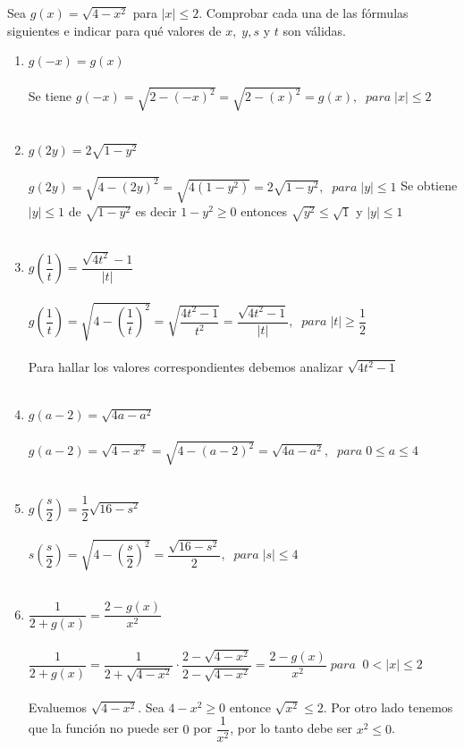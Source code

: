 \begin{ej}
Sea $g(x) = \sqrt{4-x^2}$ para $|x| \leq 2$. Comprobar cada una de las fórmulas siguientes e indicar para qué valores de $x, \; y, s$ y $t$ son válidas.
\begin{enumerate}[\bfseries a)]
\item $g(-x) = g(x)$\\\\
Se tiene $g(-x)=\sqrt{2-(-x)^2} = \sqrt{2-(x)^2} = g(x), \; \; para \; |x| \leq 2$\\\\

\item $g(2y) = 2\sqrt{1-y^2}$\\\\
$g(2y)=\sqrt{4-(2y)^2}= \sqrt{4(1-y^2)} = 2 \sqrt{1-y^2}, \; \; para \; |y|\leq 1$ Se obtiene $|y| \leq 1$  de $\sqrt{1-y^2}$ es decir $1-y^2 \geq 0$ entonces $\sqrt{y^2} \leq \sqrt{1}$ \; y \; $|y|\leq 1$\\\\

\item $g\left( \dfrac{1}{t} \right) = \dfrac{\sqrt{4t^2}-1}{|t|}$\\\\
$g\left( \dfrac{1}{t} \right) = \sqrt{4 - \left( \dfrac{1}{t} \right)^2} = \sqrt{\dfrac{4t^2 - 1}{t^2}} =\dfrac{\sqrt{4t^2 - 1}}{|t|}, \; \; para \; |t| \geq \dfrac{1}{2}$\\\\
Para hallar los valores correspondientes debemos analizar $\sqrt{4t^2 - 1}$\\\\
\item $g(a-2) = \sqrt{4a-a^2}$\\\\
$g(a-2) = \sqrt{4 - x^2} = \sqrt{4 - (a-2)^2} = \sqrt{4a - a^2}, \; \; para \; 0\leq a \leq 4$\\\\

\item $g \left( \dfrac{s}{2} \right) = \dfrac{1}{2} \sqrt{16 - s^2}$\\\\
$s\left( \dfrac{s}{2} \right) = \sqrt{4 - \left( \dfrac{s}{2} \right)^2} = \dfrac{\sqrt{16 - s^2}}{2}, \; \; para \; |s| \leq 4$\\\\

\item $\dfrac{1}{2 +g(x)} = \dfrac{2-g(x)}{x^2}$\\\\ 
$\dfrac{1}{2 +g(x)} = \dfrac{1}{2+ \sqrt{4-x^2}} \cdot \dfrac{2 - \sqrt{4-x^2}}{2 - \sqrt{4-x^2}} = \dfrac{2 - g(x)}{x^2}\; para \; \; 0 < |x| \leq 2 $\\\\ 
Evaluemos $\sqrt{4-x^2}$. Sea $4-x^2 \geq 0$ entonce $\sqrt{x^2} \leq 2$. Por otro lado tenemos que la función no puede ser $0$ por $\dfrac{1}{x^2}$, por lo tanto debe ser $x^2\leq 0$.\\\\ 
\end{enumerate}
\end{ej}

